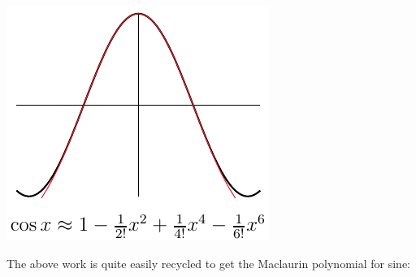 \begin{eg}
\begin{efig}
\begin{center}
  \includegraphics{approx4d}
\end{center}
\end{efig}

\end{eg}
The above work is quite easily recycled to get the Maclaurin polynomial for sine:
